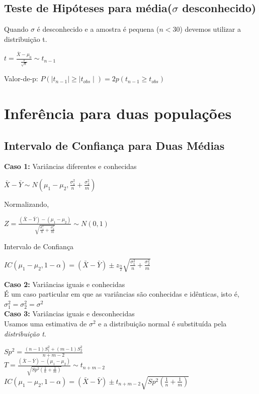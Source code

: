 \documentclass[a4paper, 12pt]{article}
\begin{document}
\subsection{Teste de Hipóteses para média($\sigma$ desconhecido)}
	Quando $\sigma$ é desconhecido e a amostra é pequena ($n<30$) devemos utilizar a distribuição t.
	\begin{center}
		\Large
		$
		t = \frac{\bar{X}-\mu_0}{\frac{s}{\sqrt{n}}}\sim t_{n-1}
		$
	\end{center}
	Valor-de-p: $P(\mid t_{n-1}\mid \geq \mid t_{obs} \mid ) = 2 p(t_{n-1}\geq t_{obs})$
	
\section{Inferência para duas populações }
\subsection{Intervalo de Confiança para Duas Médias}
	\textbf{Caso 1:} Variâncias diferentes e conhecidas
	\begin{center}
		\Large
		$
		\bar{X} - \bar{Y} \sim N(\mu_1 - \mu_2, \frac{\sigma^2_1}{n} + \frac{\sigma^2_2}{m})
		$
	\end{center}
	
	Normalizando,
	\begin{center}
		\Large
		$
		Z = \frac{(\bar{X} - \bar{Y})-(\mu_1 - \mu_2)}{\sqrt{\frac{\sigma^2_1}{n} + \frac{\sigma^2_2}{m}}} \sim N(0,1)
		$
	\end{center}

	Intervalo de Confiança
	\begin{center}
		\Large
		$
		IC(\mu_1 - \mu_2, 1 - \alpha) = (\bar{X} - \bar{Y}) \pm z_{\frac{\alpha}{2}}\sqrt{\frac{\sigma^2_1}{n} + \frac{\sigma^2_2}{m}}
		$
	\end{center}
	
	\textbf{Caso 2:} Variâncias iguais e conhecidas\\
	É um caso particular em que as variâncias são conhecidas e idênticas, isto é, $\sigma^2_1 = \sigma^2_2 = \sigma^2$\\
	
	\textbf{Caso 3:} Variâncias iguais e desconhecidas\\
	Usamos uma estimativa de $\sigma^2$ e a distribuição normal é substituída pela \textit{distribuição t}.
		\begin{center}
			\Large
			$
			Sp^2 = \frac{(n-1)S^2_1 + (m-1)S^2_2}{n+m-2}
			$\\
			$
			T = \frac{(\bar{X} - \bar{Y})-(\mu_1 - \mu_2)}{\sqrt{Sp^2(\frac{1}{n} + \frac{1}{m})}} \sim t_{n+m-2}
			$\\
			$
			IC(\mu_1 - \mu_2, 1 - \alpha) = (\bar{X} - \bar{Y}) \pm t_{n+m-2}\sqrt{Sp^2(\frac{1}{n} + \frac{1}{m})}
			$
			
		\end{center}
	
\end{document}
